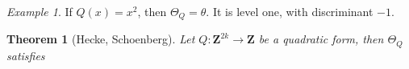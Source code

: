 \documentclass{article}
\theoremstyle{plain}
\newtheorem{theorem}{Theorem}
\theoremstyle{remark}
\newtheorem*{example}{Example}
\theoremstyle{definition}
\begin{document}
\begin{example}
    If $Q(x) = x^2$, then $\Theta_Q = \theta$. It is level one, with discriminant $-1$.
\end{example}

\begin{theorem}[Hecke, Schoenberg]
    Let $Q: \mathbf{Z}^{2k} \to \mathbf{Z}$ be a quadratic form, then $\Theta_Q$ satisfies
\end{theorem}


%
%
%
%

%
%
%
%
\end{document}
